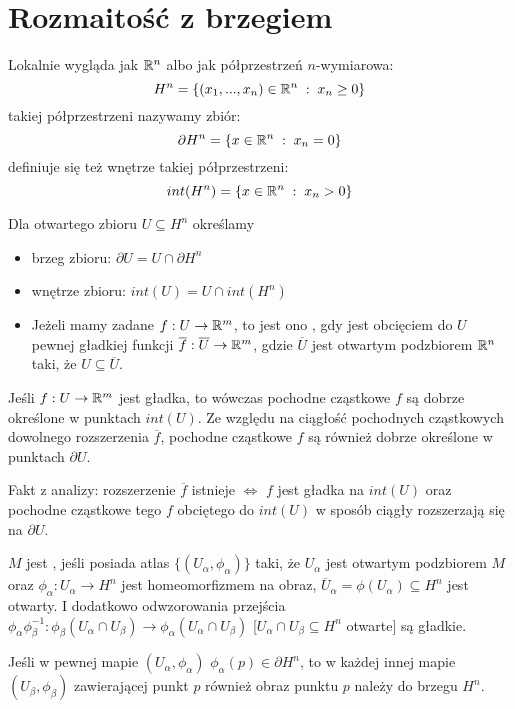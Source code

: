 \section{Rozmaitość z brzegiem}

Lokalnie wygląda jak $\mathbb{R}^n$ albo jak półprzestrzeń $n$-wymiarowa:
$$H^n=\{(x_1,...,x_n)\in\mathbb{R}^n\;:\;x_n\geq 0\}$$
 takiej półprzestrzeni nazywamy zbiór:
$$\partial H^n=\{x\in\mathbb{R}^n\;:\;x_n=0\}$$
definiuje się też wnętrze takiej półprzestrzeni:
$$int(H^n)=\{x\in\mathbb{R}^n\;:\;x_n>0\}$$

Dla otwartego zbioru $U\subseteq H^n$ określamy

\begin{itemize}
    \item[\point] brzeg zbioru: $\partial U=U\cap \partial H^n$
    \item[\point] wnętrze zbioru: $int(U)=U\cap int(H^n)$ 
    \item[\point] Jeżeli mamy zadane $f:U\to\mathbb{R}^m$, to jest ono , gdy jest obcięciem do $U$ pewnej gładkiej funkcji $\overline f:\overline U\to \mathbb{R}^m$, gdzie $\overline U$ jest otwartym podzbiorem $\mathbb{R}^n$ taki, że $U\subseteq\overline U$.
\end{itemize}

Jeśli $f:U\to\mathbb{R}^m$ jest gładka, to wówczas pochodne cząstkowe $f$ są dobrze określone w punktach $int(U)$. Ze względu na ciągłość pochodnych cząstkowych dowolnego rozszerzenia $\overline f$, pochodne cząstkowe $f$ są również dobrze określone w punktach $\partial U$. 

Fakt z analizy: rozszerzenie $\overline f$ istnieje $\iff$ $f$ jest gładka na $int(U)$ oraz pochodne cząstkowe tego $f$ obciętego do $int(U)$ w sposób ciągły rozszerzają się na $\partial U$.

$M$ jest , jeśli posiada atlas $\{(U_\alpha,\phi_\alpha)\}$ taki, że $U_\alpha$ jest otwartym podzbiorem $M$ oraz $\phi_{\alpha}:U_\alpha\to H^n$ jest homeomorfizmem na obraz, $\overline U_\alpha=\phi(U_\alpha)\subseteq H^n$ jest otwarty. I dodatkowo odwzorowania przejścia $\phi_\alpha\phi_\beta^{-1}:\phi_\beta(U_\alpha\cap U_\beta)\to\phi_\alpha(U_\alpha\cap U_\beta)$ [$U_\alpha\cap U_\beta\subseteq H^n$ otwarte] są gładkie.

 Jeśli w pewnej mapie $(U_\alpha,\phi_\alpha)$ $\phi_\alpha(p)\in\partial H^n$, to w każdej innej mapie $(U_\beta,\phi_\beta)$ zawierającej punkt $p$ również obraz punktu $p$ należy do brzegu $H^n$.

